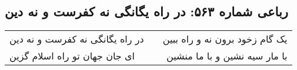 \begin{center}
\section*{رباعی شماره ۵۶۳: در راه یگانگی نه کفرست و نه دین}
\label{sec:sh563}
\begin{longtable}{l p{0.5cm} r}
در راه یگانگی نه کفرست و نه دین
&&
یک گام زخود برون نه و راه ببین
\\
ای جان جهان تو راه اسلام گزین
&&
با مار سیه نشین و با ما منشین
\\
\end{longtable}
\end{center}
